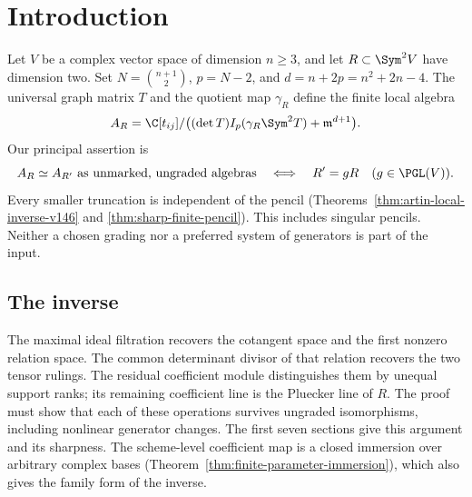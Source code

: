 \begin{abstract}
We prove that an unmarked, ungraded finite local algebra associated
with a complex quadratic pencil determines the pencil up to congruence.
The truncation order $n^2+2n-4$ is sharp, and no regularity assumption
is imposed. Multiplication recovers the first relation, its determinant
rulings, and the orientation that identifies the pencil coefficient
line. The construction extends to families over arbitrary complex
bases. On the effectively rigidified failure stack, the recovered
source carries a scalar-normalized apolar algebra bundle. The associated
multiple-incidence boundary admits explicit multi-Rees equations and
relative lifting conditions. The sharp inverse is proved independently
of this boundary application; its relative, covering, recognition,
and spectral extensions are retained in the appendices. The boundary application now includes formal
contact neighbourhoods and non-equidimensional Hilbert fibres, in the
explicitly effective deformation category. On the first nonreduced corank-two boundary,
the effective-family application determines the whole Hilbert fibre,
its two component types, their intersections, and its nilpotent ideal.
\end{abstract}
\maketitle
\section{Introduction}
\label{sec:paper-i-v163}
Let $V$ be a complex vector space of dimension $n\geq3$, and let
$R\subset\Sym^2V$ have dimension two. Set $N=\binom{n+1}{2}$,
$p=N-2$, and $d=n+2p=n^2+2n-4$. The universal graph matrix $T$ and
the quotient map $\gamma_R$ define the finite local algebra
\[
 A_R=\C[t_{ij}]/\bigl((\det T)I_p(\gamma_R\Sym^2T)
                                  +\mathfrak m^{d+1}\bigr).
\]
Our principal assertion is
\[
 A_R\simeq A_{R'}\text{ as unmarked, ungraded algebras}
       \quad\Longleftrightarrow\quad R'=gR\quad(g\in\PGL(V)).
\]
Every smaller truncation is independent of the pencil
(Theorems~\ref{thm:artin-local-inverse-v146} and
\ref{thm:sharp-finite-pencil}). This includes singular pencils.
Neither a chosen grading nor a preferred system of generators is
part of the input.

\subsection{The inverse}
The maximal ideal filtration recovers the cotangent space and the
first nonzero relation space. The common determinant divisor of
that relation recovers the two tensor rulings. The residual
coefficient module distinguishes them by unequal support ranks;
its remaining coefficient line is the Pluecker line of $R$.
The proof must show that each of these operations survives ungraded
isomorphisms, including nonlinear generator changes. The first seven
sections give this argument and its sharpness. The scheme-level
coefficient map is a closed immersion over arbitrary complex bases
(Theorem~\ref{thm:finite-parameter-immersion}), which also gives the
family form of the inverse.

